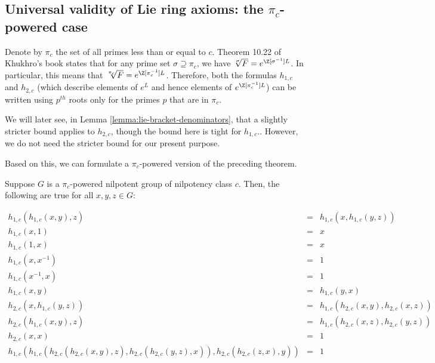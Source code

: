\documentclass{ucetd}
\begin{document}
\subsection{Universal validity of Lie ring axioms: the $\pi_c$-powered case}\label{sec:inverse-bch-pi-powered}

Denote by $\pi_c$ the set of all primes less than or equal to
$c$. Theorem 10.22 of Khukhro's book \cite{Khukhro} states that for
any prime set $\sigma \supseteq \pi_c$, we have $\sqrt[\sigma]{F} =
e^{\Z[\sigma^{-1}]L}$. In particular, this means that $\sqrt[\pi_c]{F} =
e^{\Z[\pi_c^{-1}]L}$. Therefore, both the formulas $h_{1,c}$ and
$h_{2,c}$ (which describe elements of $e^L$ and hence elements of
$e^{\Z[\pi_c^{-1}]L}$) can be written using $p^{th}$ roots only for the
primes $p$ that are in $\pi_c$.

We will later see, in Lemma \ref{lemma:lie-bracket-denominators}, that
a slightly stricter bound applies to $h_{2,c}$, though the bound here
is tight for $h_{1,c}$.. However, we do not need the stricter bound
for our present purpose.

Based on this, we can formulate a $\pi_c$-powered version of the preceding theorem.

\begin{theorem}\label{thm:inverse-bch-lie-ring-axiom-universal-validity-pi-powered}
  Suppose $G$ is a $\pi_c$-powered nilpotent group of nilpotency class
  $c$. Then, the following are true for all $x,y,z \in G$:
    
  \begin{eqnarray*}
    h_{1,c}(h_{1,c}(x,y),z) & = & h_{1,c}(x,h_{1,c}(y,z)) \\
    h_{1,c}(x,1) & = & x \\
    h_{1,c}(1,x) & = & x \\
    h_{1,c}(x,x^{-1}) & = & 1 \\
    h_{1,c}(x^{-1},x) & = & 1 \\
    h_{1,c}(x,y) & = & h_{1,c}(y,x)\\
    h_{2,c}(x,h_{1,c}(y,z)) & = & h_{1,c}(h_{2,c}(x,y),h_{2,c}(x,z))\\
    h_{2,c}(h_{1,c}(x,y),z) & = & h_{1,c}(h_{2,c}(x,z),h_{2,c}(y,z))\\
    h_{2,c}(x,x) & = & 1 \\
    h_{1,c}(h_{1,c}(h_{2,c}(h_{2,c}(x,y),z),h_{2,c}(h_{2,c}(y,z),x)),h_{2,c}(h_{2,c}(z,x),y)) & = & 1 \\
  \end{eqnarray*}
\end{theorem}
\end{document}
